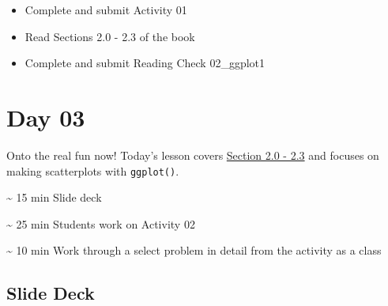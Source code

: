 \documentclass[
  letterpaper,
  DIV=11,
  numbers=noendperiod]{scrreprt}
\begin{document}
\begin{itemize}
\item
  Complete and submit Activity 01
\item
  Read Sections 2.0 - 2.3 of the book
\item
  Complete and submit Reading Check 02\_ggplot1
\end{itemize}


\hypertarget{day-03}{%
\chapter*{Day 03}\label{day-03}}

Onto the real fun now! Today's lesson covers
\href{https://nustat.github.io/intro-stat-data-sci/02-visualization.html}{Section
2.0 - 2.3} and focuses on making scatterplots with \texttt{ggplot()}.

\begin{tcolorbox}[enhanced jigsaw, toptitle=1mm, colback=white, arc=.35mm, rightrule=.15mm, titlerule=0mm, left=2mm, breakable, bottomtitle=1mm, bottomrule=.15mm, leftrule=.75mm, title={Agenda}, colframe=quarto-callout-note-color-frame, opacitybacktitle=0.6, toprule=.15mm, colbacktitle=quarto-callout-note-color!10!white, coltitle=black, opacityback=0]
\textasciitilde{} 15 min Slide deck

\textasciitilde{} 25 min Students work on Activity 02

\textasciitilde{} 10 min Work through a select problem in detail from
the activity as a class
\end{tcolorbox}

\hypertarget{slide-deck-2}{%
\section*{Slide Deck}\label{slide-deck-2}}
\end{document}
